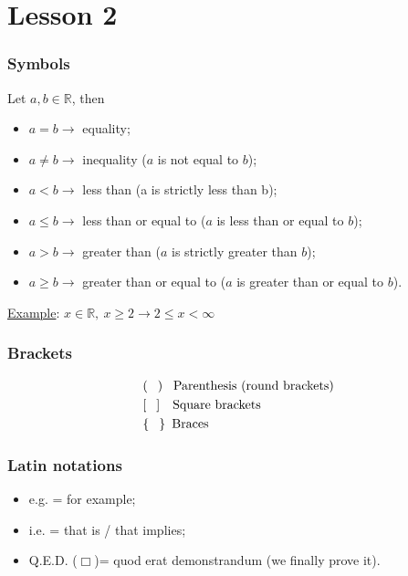 \documentclass{article}
\begin{document}
\newpage
\part{Lesson 2}

\section{Symbols}
Let $a,b \in \mathbb{R}$, then
\begin{itemize}[label=--]
    \item $a=b \rightarrow$ equality;
    \item $a \neq b \rightarrow$ inequality ($a$ is not equal to $b$);
    \item $a<b \rightarrow$ less than (a is strictly less than b);
    \item $a\leq b \rightarrow$ less than or equal to ($a$ is less than or equal to $b$);
    \item $a>b \rightarrow$ greater than ($a$ is strictly greater than $b$);
    \item $a\geq b \rightarrow$ greater than or equal to ($a$ is greater than or equal to $b$).
\end{itemize}

\underline{Example}: $x \in \mathbb{R},\ x \geq 2 \rightarrow 2 \leq x < \infty$

\section{Brackets}
\begin{align*}
    &\left(\phantom{-}\right) \text{ \ Parenthesis (round brackets)}\\
    &\left[\phantom{-}\right] \text{ \, Square brackets}\\
    &\left\{\phantom{-}\right\} \text{ Braces}
\end{align*}

\section{Latin notations}
\begin{itemize}
    \item e.g. = for example;
    \item i.e. = that is / that implies;
    \item Q.E.D. ($\Box$)= quod erat demonstrandum (we finally prove it).
\end{itemize}
\end{document}
